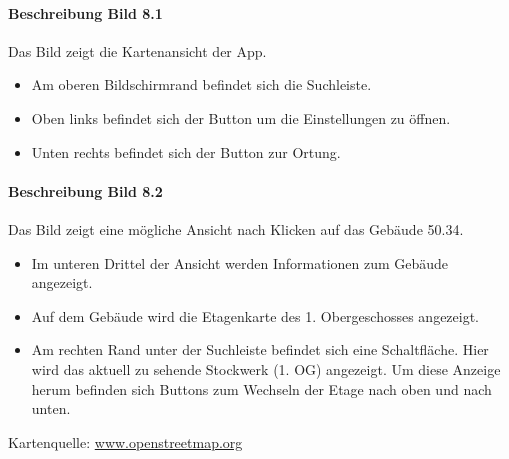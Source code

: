 \paragraph{Beschreibung Bild 8.1}
Das Bild zeigt die \Gls{Kartenansicht} der App.
\begin{itemize}
    \item Am oberen Bildschirmrand befindet sich die Suchleiste.
    \item Oben links befindet sich der Button um die Einstellungen zu öffnen.
    \item Unten rechts befindet sich der Button zur \Gls{Ortung}.
\end{itemize}
\paragraph{Beschreibung Bild 8.2}
Das Bild zeigt eine mögliche Ansicht nach Klicken auf das Gebäude 50.34.
\begin{itemize}
    \item Im unteren Drittel der Ansicht werden Informationen zum Gebäude angezeigt.
    \item Auf dem Gebäude wird die \Gls{Etagenkarte} des 1. Obergeschosses angezeigt.
    \item Am rechten Rand unter der Suchleiste befindet sich eine Schaltfläche. Hier wird das aktuell zu sehende Stockwerk (1. OG) angezeigt. Um diese Anzeige herum befinden sich Buttons zum Wechseln der Etage nach oben und nach unten.
\end{itemize}
Kartenquelle: \href{https://www.openstreetmap.org/}{www.openstreetmap.org}
